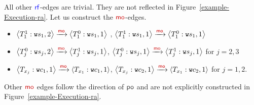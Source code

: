 All other $\rf$-edges are trivial. They are not reflected in Figure~\ref{example-Execution-ra}. Let us construct the $\mo$-edges.
\begin{itemize}
 \item $\tuple{T_1^1:\wt{s_1,2}} \xra{\mo}\allowbreak \tuple{T_1^0:\wt{s_1,1}}$ , $\tuple{T_1^1:\wt{s_1,1}} \xra{\mo}\allowbreak \tuple{T_1^0:\wt{s_1,1}}$
 
 \item $\tuple{T_j^0:\wt{s_j,2}} \xra{\mo}\allowbreak \tuple{T_j^1:\wt{s_j,1}}$, $\tuple{T_j^0:\wt{s_j,1}} \xra{\mo}\allowbreak \tuple{T_j^1:\wt{s_j,1}}$ for $j=2,3$
 
 \item $\tuple{T_{x_j}:\wt{c_1,1}} \xra{\mo}\allowbreak \tuple{T_{x_1}:\wt{c_1,1}}$, $\tuple{T_{x_j}:\wt{c_2,1}} \xra{\mo}\allowbreak \tuple{T_{x_1}:\wt{c_2,1}}$ for $j=1,2$.
\end{itemize}

Other $\mo$ edges follow the direction of $\po$ and are not explicitly constructed in Figure~\ref{example-Execution-ra}. %


 
